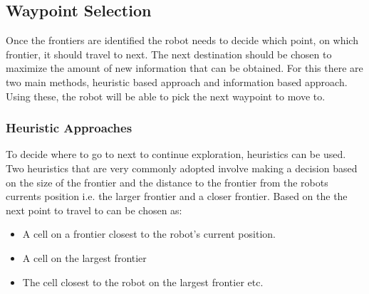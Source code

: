 \documentclass[a4paper,12pt]{article}
\begin{document}
			\subsection{Waypoint Selection}

				Once the frontiers are identified the robot needs to decide which point, on which frontier, it should travel to next. The next destination should be chosen to maximize the amount of new information that can be obtained. For this there are two main methods, heuristic based approach and information based approach. Using these, the robot will be able to pick the next waypoint to move to. 

				\subsubsection{Heuristic Approaches}

					To decide where to go to next to continue exploration, heuristics can be used. Two heuristics that are very commonly adopted involve making a decision based on the size of the frontier and the distance to the frontier from the robots currents position i.e. the larger frontier and a closer frontier. Based on the the next point to travel to can be chosen as: 					\begin{itemize}
						\item A cell on a frontier closest to the robot's current position.
						\item A cell on the largest frontier
						\item The cell closest to the robot on the largest frontier etc.
					\end{itemize}
				
\end{document}
